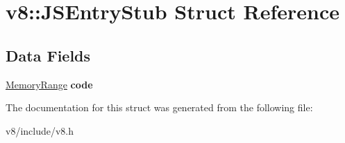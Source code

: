 \hypertarget{structv8_1_1JSEntryStub}{}\section{v8\+:\+:J\+S\+Entry\+Stub Struct Reference}
\label{structv8_1_1JSEntryStub}
\subsection*{Data Fields}
\begin{DoxyCompactItemize}
\item 
\mbox{\label{structv8_1_1JSEntryStub_a86cf44d2ee29d523a33a0f2f2fe407d0}} 
\mbox{\hyperlink{structv8_1_1MemoryRange}{Memory\+Range}} {\bfseries code}
\end{DoxyCompactItemize}


The documentation for this struct was generated from the following file\+:\begin{DoxyCompactItemize}
\item 
v8/include/v8.\+h\end{DoxyCompactItemize}
